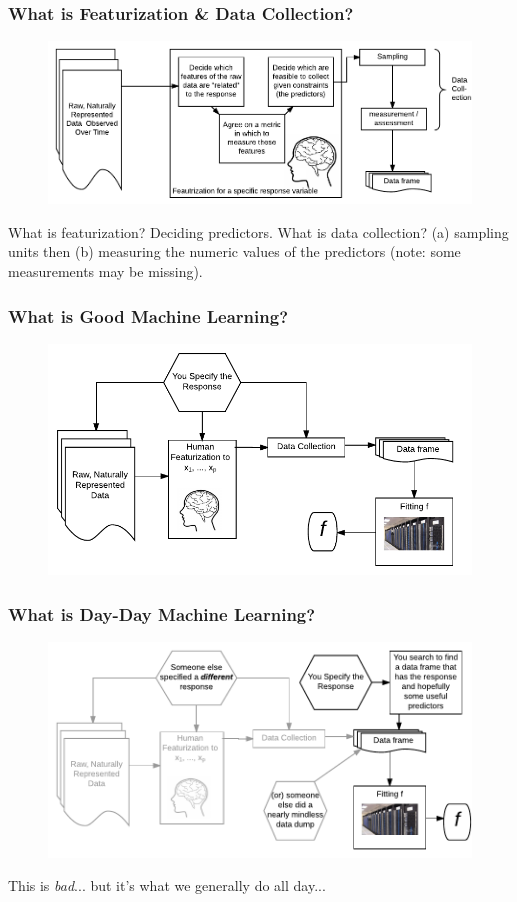 \documentclass[handout]{beamer}
\begin{document}
\begin{frame}\frametitle{What is Featurization \& Data Collection?}

\begin{figure}
\centering
\includegraphics[width=4.5in]{featurization}
\end{figure}

What is featurization?  \pause Deciding predictors. What is data collection?  \pause (a) sampling units then  \pause (b) measuring the numeric values of the predictors  \pause (note: some measurements may be missing).

\end{frame}

\begin{frame}\frametitle{What is Good Machine Learning?}
\begin{figure}
\centering
\includegraphics[width=4.5in]{good_machine_learning}
\end{figure}

	
\end{frame}

\begin{frame}\frametitle{What is Day-Day Machine Learning?}
\begin{figure}
\centering
\includegraphics[width=4.5in]{bad_machine_learning}
\end{figure}

This is \emph{bad}... but it's what we generally do all day...
	
\end{frame}
\end{document}

